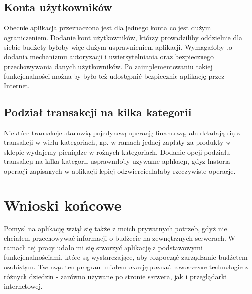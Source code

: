 \documentclass[shortabstract,inz]{iithesis}
\begin{document}
\subsection{Konta użytkowników}
Obecnie aplikacja przeznaczona jest dla jednego konta co jest dużym ograniczeniem. Dodanie kont użytkowników, którzy prowadziliby oddzielnie dla siebie budżety byłoby więc dużym usprawnieniem aplikacji. Wymagałoby to dodania mechanizmu autoryzacji i uwierzytelniania oraz bezpiecznego przechowywania danych użytkowników. Po zaimplementowaniu takiej funkcjonalności można by było też udostępnić bezpiecznie aplikację przez Internet.
\subsection{Podział transakcji na kilka kategorii}
Niektóre transakcje stanowią pojedynczą operację finansową, ale składają się z transakcji w wielu kategoriach, np. w ramach jednej zapłaty za produkty w sklepie wydajemy pieniądze w różnych kategoriach. Dodanie opcji podziału transakcji na kilka kategorii usprawniłoby używanie aplikacji, gdyż historia operacji zapisanych w aplikacji lepiej odzwierciedlałaby rzeczywiste operacje.
\section{Wnioski końcowe}
Pomysł na aplikację wziął się także z moich prywatnych potrzeb, gdyż nie chciałem przechowywać informacji o budżecie na zewnętrznych serwerach. W ramach tej pracy udało mi się stworzyć aplikację z podstawowymi funkcjonalnościami, które są wystarczające, aby rozpocząć zarządzanie budżetem osobistym. Tworząc ten program miałem okazję poznać nowoczesne technologie z różnych dziedzin - zarówno używane po stronie serwera, jak i przeglądarki internetowej.



\end{document}
